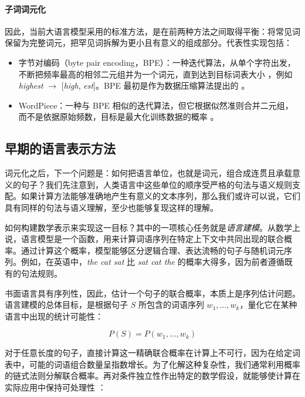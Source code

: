 \paragraph{子词词元化} 因此，当前大语言模型采用的标准方法，是在前两种方法之间取得平衡：将常见词保留为完整词元，把罕见词拆解为更小且有意义的组成部分。代表性实现包括：

\begin{itemize}
    \item 字节对编码（byte pair encoding，BPE）：一种迭代算法，从单个字符出发，不断把频率最高的相邻二元组并为一个词元，直到达到目标词表大小 \citep{sennrich-etal-2016-neural}，例如 \textit{highest} $\rightarrow$ [\textit{high}, \textit{est}]。BPE 最初是作为数据压缩算法提出的 \citep{gage1994new}。
    \item WordPiece：一种与 BPE 相似的迭代算法，但它根据似然准则合并二元组，而不是依据原始频数，目标是最大化训练数据的概率 \citep{wu2016googlesneuralmachinetranslation}。
\end{itemize}

\subsection{早期的语言表示方法}
\label{sec:early}
词元化之后，下一个问题是：如何把语言单位，也就是词元，组合成连贯且承载意义的句子？我们先注意到，人类语言中这些单位的顺序受严格的句法与语义规则支配。如果计算方法能够准确地产生有意义的文本序列，那么我们或许可以说，它们具有同样的句法与语义理解，至少也能够复现这样的理解。

如何构建数学表示来实现这一目标？其中的一项核心任务就是\emph{语言建模}。从数学上说，语言模型是一个函数，用来计算词语序列在特定上下文中共同出现的联合概率。通过计算这个概率，模型能够区分逻辑合理、表达流畅的句子与随机词元序列。例如，在英语中，\textit{the cat sat} 比 \textit{sat cat the} 的概率大得多，因为前者遵循既有的句法规则。

书面语言具有序列性，因此，估计一个句子的联合概率，本质上是序列估计问题。语言建模的总体目标，是根据句子 $S$ 所包含的词语序列 $w_1, \dots, w_k$，量化它在某种语言中出现的统计可能性：

\begin{equation}
    \label{eq:language-sequence}
    P(S) = P(w_1, \dots, w_k)
\end{equation}

对于任意长度的句子，直接计算这一精确联合概率在计算上不可行，因为在给定词表中，可能的词语组合数量呈指数增长。为了化解这种复杂性，我们通常利用概率的链式法则分解联合概率。再对条件独立性作出特定的数学假设，就能够使计算在实际应用中保持可处理性 \citep{jm3}：

